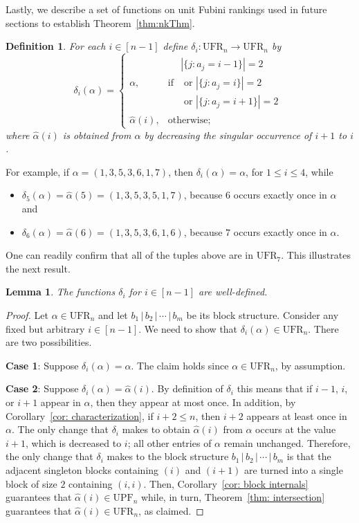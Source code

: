 \documentclass[11pt,reqno]{amsart}
\newcommand{\ufr}[1]{\mathrm{UFR}_{#1}}
\newcommand{\upf}[1]{\mathrm{UPF}_{#1}}
\newtheorem{lemma}[rethm]{Lemma}
\newtheorem{definition}[rethm]{Definition}
\begin{document}
Lastly, we describe a set of functions on unit Fubini rankings used in future sections to establish Theorem~\ref{thm:nkThm}. 
\begin{definition}
\label{def: delta}
For each $i\in[n-1]$ define $\delta_i: \ufr{n}\to\ufr{n}$  by
\begin{equation}
\label{eq: delta}
    \delta_i(\alpha) =
    \begin{cases}
        \alpha, & \text{if } \substack{|\{j : a_j = i-1\}| = 2 \\ \text{ or } |\{j : a_j = i\}| = 2 \\ \text{ or } |\{j : a_j = i+1\}| = 2} \\
        \widehat{\alpha}(i), & \text{otherwise;}
    \end{cases}
\end{equation}
where $\widehat{\alpha}(i)$ is obtained from $\alpha$ by decreasing the singular occurrence of $i+1$ to $i$.
\end{definition}
For example, if $\alpha=(1,3,5,3,6,1,7)$, then $\delta_i(\alpha) = \alpha$, for $1\leq i\leq 4$, while
\begin{itemize}
    \item $\delta_5(\alpha)=\widehat{\alpha}(5)=(1,3,5,3,5,1,7)$, because $6$ occurs exactly once in $\alpha$ and
    \item $\delta_6(\alpha)=\widehat{\alpha}(6)=(1,3,5,3,6,1,6)$, because $7$ occurs exactly once in $\alpha$.
\end{itemize}
One can readily confirm that all of the tuples above are in $\ufr{7}$.
This illustrates the next result.
\begin{lemma}
The functions $\delta_i$ for $i \in [n-1]$ are well-defined.
\end{lemma}

\begin{proof}
Let $\alpha \in \ufr{n}$ and let $b_1 \,|\, b_2 \,|\, \cdots \,|\,b_m$ be its block structure.
Consider any fixed but arbitrary $i\in[n-1]$.
We need to show that $\delta_i(\alpha) \in \ufr{n}$.
There are two possibilities.

\noindent\textbf{Case 1}: 
Suppose $\delta_i(\alpha) = \alpha$.
The claim holds since $\alpha \in \ufr{n}$, by assumption.

\noindent\textbf{Case 2}: 
Suppose $\delta_i(\alpha) = \widehat{\alpha}(i)$. 
By definition of $\delta_i$ this means that if $i-1$, $i$, or $i+1$
appear in $\alpha$, then they appear at most once.
In addition, by Corollary~\ref{cor: characterization}, if $i+2\leq n$, then $i+2$ appears at least once in $\alpha$. 
The only change that $\delta_i$ makes to obtain $\widehat{\alpha}(i)$ from $\alpha$ occurs at the value $i+1$, which is decreased to $i$; all other entries of $\alpha$ remain unchanged.
Therefore, the only change that $\delta_i$ makes to the block structure $b_1 \,|\, b_2 \,|\, \cdots \,|\,b_m$ 
is that 
the adjacent singleton blocks containing $(i)$ and $(i+1)$
are turned into a single block of size $2$ containing $(i,i)$.
Then, Corollary~\ref{cor: block internals} guarantees that $\widehat{\alpha}(i)\in\upf{n}$ while, in turn, Theorem~\ref{thm: intersection} guarantees that $\widehat{\alpha}(i)\in\ufr{n}$, as claimed.
\end{proof}
\end{document}
